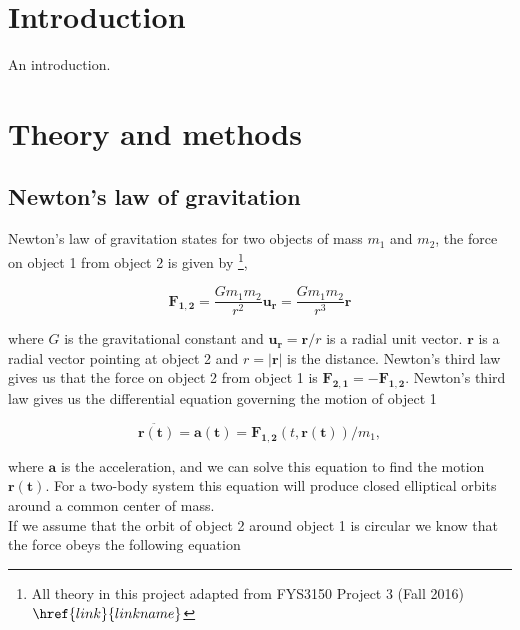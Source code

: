 \documentclass[%
 reprint,
 nobalance,
 amsmath,amssymb,
 aps,
]{revtex4-1}
\begin{document}

\maketitle

\section{\label{sec:Int}Introduction}
An introduction.


\section{\label{sec:The}Theory and methods}

\subsection{\label{sec:New}Newton's law of gravitation}
Newton's law of gravitation states for two objects of mass $m_1$ and $m_2$, the force on object 1 from object 2 is given by \footnote{All theory in this project adapted from FYS3150 Project 3 (Fall 2016) $\href{link}{linkname}$},

\begin{equation}
	\bm{F_{1,2}} = \frac{Gm_1 m_2}{r^2} \bm{u_r} = \frac{Gm_1 m_2}{r^3} \bm{r}
\end{equation}

where $G$ is the gravitational constant and $\bm{u_r} = \bm{r}/r$ is a radial unit vector. $\bm{r}$ is a radial vector pointing at object 2 and $r = \left|\bm{r}\right| $ is the distance. Newton's third law gives us that the force on object 2 from object 1 is $\bm{F_{2,1}} = - \bm{F_{1,2}}$. Newton's third law gives us the differential equation governing the motion of object 1

\begin{equation}
	\bm{\ddot{r(t)}} = \bm{a(t)} = \bm{F_{1,2}}(t, \bm{r(t)})/m_1,
\end{equation}

where $\bm{a}$ is the acceleration, and we can solve this equation to find the motion $\bm{r(t)}$. For a two-body system this equation will produce closed elliptical orbits around a common center of mass.\\
If we assume that the orbit of object 2 around object 1 is circular we know that the force obeys the following equation
\end{document}

